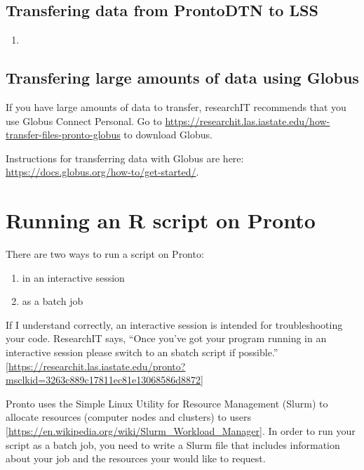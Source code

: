 \documentclass[
]{book}
\providecommand{\tightlist}{%
  \setlength{\itemsep}{0pt}\setlength{\parskip}{0pt}}
\begin{document}
\hypertarget{transfering-data-from-prontodtn-to-lss}{%
\subsection{Transfering data from ProntoDTN to LSS}\label{transfering-data-from-prontodtn-to-lss}}

\begin{enumerate}
\def\labelenumi{\arabic{enumi}.}
\tightlist
\item
\end{enumerate}

\hypertarget{transfering-large-amounts-of-data-using-globus}{%
\subsection{Transfering large amounts of data using Globus}\label{transfering-large-amounts-of-data-using-globus}}

If you have large amounts of data to transfer, researchIT recommends that you use Globus Connect Personal. Go to \url{https://researchit.las.iastate.edu/how-transfer-files-pronto-globus} to download Globus.

Instructions for transferring data with Globus are here: \url{https://docs.globus.org/how-to/get-started/}.

\hypertarget{running-an-r-script-on-pronto}{%
\section{Running an R script on Pronto}\label{running-an-r-script-on-pronto}}

There are two ways to run a script on Pronto:

\begin{enumerate}
\def\labelenumi{\arabic{enumi}.}
\tightlist
\item
  in an interactive session
\item
  as a batch job
\end{enumerate}

If I understand correctly, an interactive session is intended for troubleshooting your code. ResearchIT says, ``Once you've got your program running in an interactive session please switch to an sbatch script if possible.'' {[}\url{https://researchit.las.iastate.edu/pronto?msclkid=3263c889c17811ec81e13068586d8872}{]}

Pronto uses the Simple Linux Utility for Resource Management (Slurm) to allocate resources (computer nodes and clusters) to users {[}\url{https://en.wikipedia.org/wiki/Slurm_Workload_Manager}{]}. In order to run your script as a batch job, you need to write a Slurm file that includes information about your job and the resources your would like to request.
\end{document}
